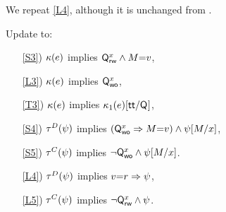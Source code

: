 We repeat \ref{L4}, although it is unchanged from .
\begin{definition}[$\xCO$]
  \label{def:pomsets-co}
  Update  to:
  \begin{enumerate}
  \item[\ref{S3})]
    $\kappa(e)$ implies $\mathsf{Q}_{\mathsf{rw}}^{x}\land M{=}v$,
  \item[\ref{L3})]
    $\kappa(e)$ implies $\mathsf{Q}_{\mathsf{wo}}^{x}$,
  \item[\ref{T3})]
    $\kappa(e)$ implies $\kappa_1(e)[\mathsf{tt}/\mathsf{Q}_{}]$,
  \end{enumerate}
  \begin{enumerate}
  \item[\ref{S4})]
    $\aTr{\bEvs}{\bForm}$ implies $(\mathsf{Q}_{\mathsf{wo}}^{x}\Rightarrow M{=}v)\land\psi[M/x]$,
  \item[\ref{S5})]
    $\aTr{\cEvs}{\bForm}$ implies $\lnot\mathsf{Q}_{\mathsf{wo}}^{x}\land \psi[M/x]$.
  \item[\ref{L4})]
    $\aTr{\bEvs}{\bForm}$ implies $v{=}r\Rightarrow\psi$, 
  \item[\ref{L5})]
    $\aTr{\cEvs}{\bForm}$ implies $\lnot\mathsf{Q}_{\mathsf{rw}}^{x} \land\psi$.
  \end{enumerate}
\end{definition}



